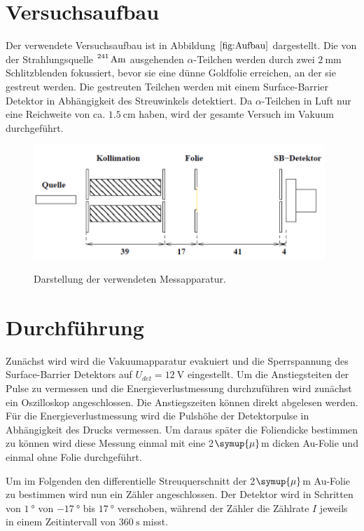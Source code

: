 \section{Versuchsaufbau}
Der verwendete Versuchsaufbau ist in Abbildung $\ref{fig:Aufbau}$ dargestellt. Die von der
Strahlungsquelle $\ce{^{241} Am}$ ausgehenden $\alpha$-Teilchen werden durch zwei $\SI{2}{\mm}$
Schlitzblenden fokussiert, bevor sie eine dünne Goldfolie erreichen, an der sie gestreut werden.
Die gestreuten Teilchen werden mit einem Surface-Barrier Detektor in Abhängigkeit des Streuwinkels
detektiert. Da $\alpha$-Teilchen in Luft nur eine Reichweite von ca. $\SI{1,5}{\cm}$ haben, wird der gesamte
Versuch im Vakuum durchgeführt.
\begin{figure}
  \centering
  \includegraphics[width=11cm]{Aufbau.png}
  \caption{Darstellung der verwendeten Messapparatur.}
  \label{fig:Aufbau}
  \cite{skript}
\end{figure}

\section{Durchführung}
Zunächst wird wird die Vakuumapparatur evakuiert und die Sperrspannung des Surface-Barrier Detektors auf
$U_{det}=\SI{12}{\V}$ eingestellt. Um die Anstiegsteiten der Pulse zu vermessen und die Energieverlustmessung
durchzuführen wird zunächst ein Oszilloskop angeschlossen. Die Anstiegszeiten können direkt abgelesen werden.
Für die Energieverlustmessung wird die Pulshöhe der Detektorpulse in Abhängigkeit des Drucks vermessen. Um
daraus später die Foliendicke bestimmen zu können wird diese Messung einmal mit eine 2\:$\symup{\mu}$m dicken
Au-Folie und einmal ohne Folie durchgeführt.

Um im Folgenden den differentielle Streuquerschnitt der 2\:$\symup{\mu}$m Au-Folie zu bestimmen wird nun ein Zähler
angeschlossen. Der Detektor wird in Schritten von $\SI{1}{\degree}$ von $\SI{-17}{\degree}$ bis $\SI{17}{\degree}$
verschoben, während der Zähler die Zählrate $I$ jeweils in einem Zeitintervall von $\SI{360}{\s}$ misst.

